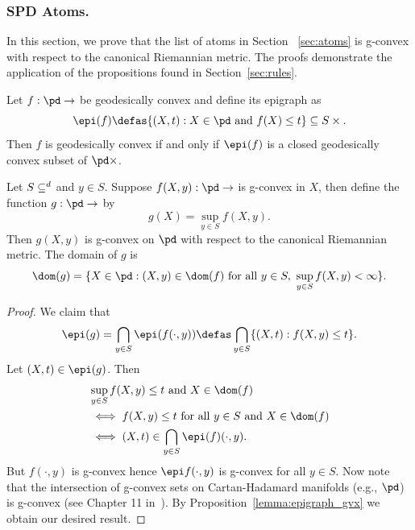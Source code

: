 \documentclass[twoside,11pt]{article}
\begin{document}
\subsubsection{SPD Atoms.}
In this section, we prove that the list of atoms in Section ~\ref{sec:atoms} is g-convex with respect to the canonical Riemannian metric. The proofs demonstrate the application of the propositions found in Section~\ref{sec:rules}. 


\begin{lemma}\label{lemma:epigraph_gvx}
    Let $f:\pd \to \real$ be geodesically convex and define its epigraph as $$\epi(f) \defas \{(X,t) : X \in \pd \text{ and } f(X) \leq t\} \subseteq S \times \real.$$ Then $f$ is geodesically convex if and only if $\epi(f)$ is a closed geodesically convex subset of $\pd \times \real$.
\end{lemma}


\begin{prop}\label{prop:sup_gvx}
 Let $S\subseteq \real^d$ and  $y \in S$. Suppose $f(X,y): \pd \to \real$ is g-convex in $X$, then define the function $g: \pd \to \real$ by 
    \begin{equation*}
        g(X) = \sup_{y \in S}f(X,y).
    \end{equation*}
    Then $g(X,y)$ is g-convex on $\pd$ with respect to the canonical Riemannian metric. The domain of $g$ is 
    \begin{equation*}
        \dom (g) = \{X \in \pd : (X,y) \in \dom(f) \text{ for all } y \in S, \ \sup_{y \in S}f(X,y) < \infty\}.
    \end{equation*}   
\end{prop}

\begin{proof}
     We claim that 
    \begin{equation*}
        \epi(g) = \bigcap_{y \in S}\epi(f(\cdot, y)) \defas \bigcap_{y \in S}\{(X,t): f(X,y) \leq t\}.
    \end{equation*}
    Let $(X,t) \in \epi(g)$. Then 
    \begin{align*}
        \begin{split}
            &\sup_{y \in S} f(X,y) \leq t \text{ and } X \in \dom(f) 
            \\&\iff f(X,y) \leq t \text{ for all } y \in S  \text{ and } X \in \dom(f) 
            \\&\iff (X,t) \in \bigcap_{y \in S} \epi(f)(\cdot, y).
        \end{split}
    \end{align*} 
But $f(\cdot, y)$ is g-convex hence $\epi f(\cdot, y)$ is g-convex for all $y \in S$. Now note that the intersection of g-convex sets on Cartan-Hadamard manifolds (e.g., $\pd$) is g-convex (see Chapter 11 in~\citet{boumal2020introduction}). By Proposition~\ref{lemma:epigraph_gvx} we obtain our desired result. 
\end{proof}
 
\end{document}
